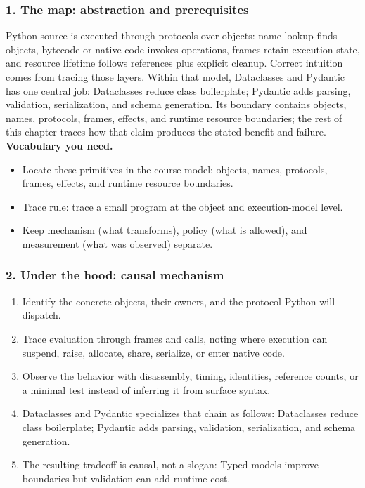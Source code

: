 \subsubsection*{1. The map: abstraction and prerequisites}
Python source is executed through protocols over objects: name lookup finds objects, bytecode or native code invokes operations, frames retain execution state, and resource lifetime follows references plus explicit cleanup. Correct intuition comes from tracing those layers.
Within that model, Dataclasses and Pydantic has one central job: Dataclasses reduce class boilerplate; Pydantic adds parsing, validation, serialization, and schema generation. Its boundary contains objects, names, protocols, frames, effects, and runtime resource boundaries; the rest of this chapter traces how that claim produces the stated benefit and failure.
\textbf{Vocabulary you need.}\begin{itemize}
\item Locate these primitives in the course model: objects, names, protocols, frames, effects, and runtime resource boundaries.
\item Trace rule: trace a small program at the object and execution-model level.
\item Keep mechanism (what transforms), policy (what is allowed), and measurement (what was observed) separate.
\end{itemize}
\subsubsection*{2. Under the hood: causal mechanism}\begin{enumerate}
\item Identify the concrete objects, their owners, and the protocol Python will dispatch.
\item Trace evaluation through frames and calls, noting where execution can suspend, raise, allocate, share, serialize, or enter native code.
\item Observe the behavior with disassembly, timing, identities, reference counts, or a minimal test instead of inferring it from surface syntax.
\item Dataclasses and Pydantic specializes that chain as follows: Dataclasses reduce class boilerplate; Pydantic adds parsing, validation, serialization, and schema generation.
\item The resulting tradeoff is causal, not a slogan: Typed models improve boundaries but validation can add runtime cost.
\end{enumerate}
